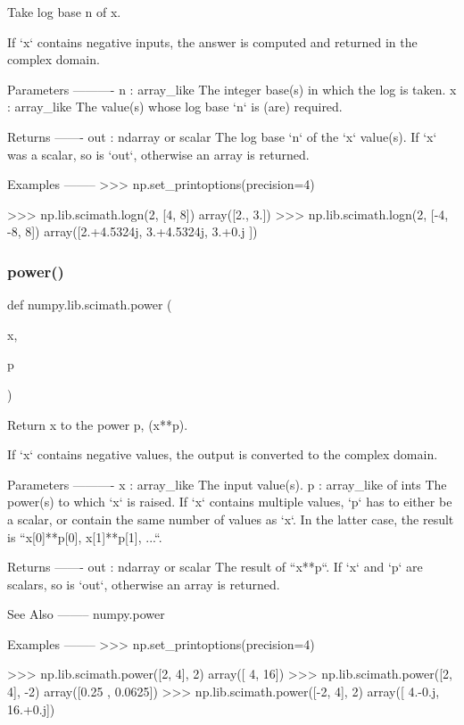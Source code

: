 \begin{DoxyVerb}Take log base n of x.

If `x` contains negative inputs, the answer is computed and returned in the
complex domain.

Parameters
----------
n : array_like
   The integer base(s) in which the log is taken.
x : array_like
   The value(s) whose log base `n` is (are) required.

Returns
-------
out : ndarray or scalar
   The log base `n` of the `x` value(s). If `x` was a scalar, so is
   `out`, otherwise an array is returned.

Examples
--------
>>> np.set_printoptions(precision=4)

>>> np.lib.scimath.logn(2, [4, 8])
array([2., 3.])
>>> np.lib.scimath.logn(2, [-4, -8, 8])
array([2.+4.5324j, 3.+4.5324j, 3.+0.j    ])\end{DoxyVerb}
 \mbox{\label{namespacenumpy_1_1lib_1_1scimath_add4d264003a9655b6720b3e5aaca7caf}} 
\subsubsection{\texorpdfstring{power()}{power()}}
{\footnotesize\ttfamily def numpy.\+lib.\+scimath.\+power (\begin{DoxyParamCaption}\item[{}]{x,  }\item[{}]{p }\end{DoxyParamCaption})}

\begin{DoxyVerb}Return x to the power p, (x**p).

If `x` contains negative values, the output is converted to the
complex domain.

Parameters
----------
x : array_like
    The input value(s).
p : array_like of ints
    The power(s) to which `x` is raised. If `x` contains multiple values,
    `p` has to either be a scalar, or contain the same number of values
    as `x`. In the latter case, the result is
    ``x[0]**p[0], x[1]**p[1], ...``.

Returns
-------
out : ndarray or scalar
    The result of ``x**p``. If `x` and `p` are scalars, so is `out`,
    otherwise an array is returned.

See Also
--------
numpy.power

Examples
--------
>>> np.set_printoptions(precision=4)

>>> np.lib.scimath.power([2, 4], 2)
array([ 4, 16])
>>> np.lib.scimath.power([2, 4], -2)
array([0.25  ,  0.0625])
>>> np.lib.scimath.power([-2, 4], 2)
array([ 4.-0.j, 16.+0.j])\end{DoxyVerb}
 \mbox{\label{namespacenumpy_1_1lib_1_1scimath_a62a6a855729e4cb6bcf2fa28b65f0b17}} 
